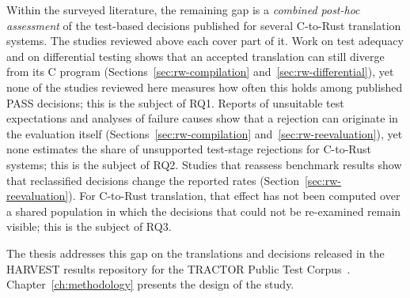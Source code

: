Within the surveyed literature, the remaining gap is a \emph{combined post-hoc assessment} of the test-based decisions published for several C-to-Rust translation systems. The studies reviewed above each cover part of it. Work on test adequacy and on differential testing shows that an accepted translation can still diverge from its C program (Sections~\ref{sec:rw-compilation} and~\ref{sec:rw-differential}), yet none of the studies reviewed here measures how often this holds among published PASS decisions; this is the subject of RQ1. Reports of unsuitable test expectations and analyses of failure causes show that a rejection can originate in the evaluation itself (Sections~\ref{sec:rw-compilation} and~\ref{sec:rw-reevaluation}), yet none estimates the share of unsupported test-stage rejections for C-to-Rust systems; this is the subject of RQ2. Studies that reassess benchmark results show that reclassified decisions change the reported rates (Section~\ref{sec:rw-reevaluation}). For C-to-Rust translation, that effect has not been computed over a shared population in which the decisions that could not be re-examined remain visible; this is the subject of RQ3.

The thesis addresses this gap on the translations and decisions released in the HARVEST results repository for the TRACTOR Public Test Corpus~\cite{harvest-results,tractor-test-corpus,schesch2026actor}. Chapter~\ref{ch:methodology} presents the design of the study.

